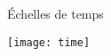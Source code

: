 
\begingroup

\begin{frame}{Échelles de temps}
  \begin{center}
    \texttt{[image: time]}\\
  \end{center}
\end{frame}

\endgroup
\endinput
